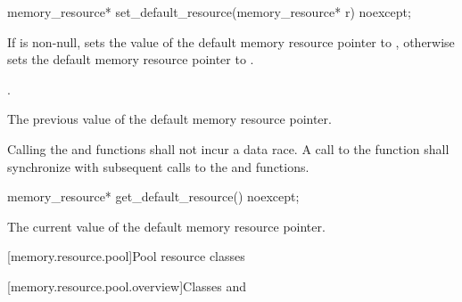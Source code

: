 %
\begin{itemdecl}
memory_resource* set_default_resource(memory_resource* r) noexcept;
\end{itemdecl}

\begin{itemdescr}
\pnum
\effects
If  is non-null,
sets the value of the default memory resource pointer to ,
otherwise sets the default memory resource pointer to .

\pnum
\postcondition
{}.

\pnum
\returns
The previous value of the default memory resource pointer.

\pnum
\remarks
Calling the  and
 functions shall not incur a data race.
A call to the  function
shall synchronize with subsequent calls to
the  and  functions.
\end{itemdescr}

%
\begin{itemdecl}
memory_resource* get_default_resource() noexcept;
\end{itemdecl}

\begin{itemdescr}
\pnum
\returns
The current value of the default memory resource pointer.
\end{itemdescr}

[memory.resource.pool]{Pool resource classes}

[memory.resource.pool.overview]{Classes  and }


